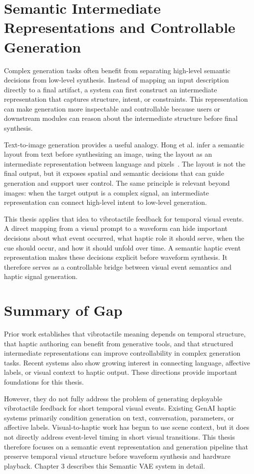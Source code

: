 \section{Semantic Intermediate Representations and Controllable Generation}

Complex generation tasks often benefit from separating high-level semantic decisions from low-level synthesis. Instead of mapping an input description directly to a final artifact, a system can first construct an intermediate representation that captures structure, intent, or constraints. This representation can make generation more inspectable and controllable because users or downstream modules can reason about the intermediate structure before final synthesis.

Text-to-image generation provides a useful analogy. Hong et al. infer a semantic layout from text before synthesizing an image, using the layout as an intermediate representation between language and pixels~\cite{hong2018semanticlayout}. The layout is not the final output, but it exposes spatial and semantic decisions that can guide generation and support user control. The same principle is relevant beyond images: when the target output is a complex signal, an intermediate representation can connect high-level intent to low-level generation.

This thesis applies that idea to vibrotactile feedback for temporal visual events. A direct mapping from a visual prompt to a waveform can hide important decisions about what event occurred, what haptic role it should serve, when the cue should occur, and how it should unfold over time. A semantic haptic event representation makes these decisions explicit before waveform synthesis. It therefore serves as a controllable bridge between visual event semantics and haptic signal generation.

\section{Summary of Gap}

Prior work establishes that vibrotactile meaning depends on temporal structure, that haptic authoring can benefit from generative tools, and that structured intermediate representations can improve controllability in complex generation tasks. Recent systems also show growing interest in connecting language, affective labels, or visual context to haptic output. These directions provide important foundations for this thesis.

However, they do not fully address the problem of generating deployable vibrotactile feedback for short temporal visual events. Existing GenAI haptic systems primarily condition generation on text, conversation, parameters, or affective labels. Visual-to-haptic work has begun to use scene context, but it does not directly address event-level timing in short visual transitions. This thesis therefore focuses on a semantic event representation and generation pipeline that preserve temporal visual structure before waveform synthesis and hardware playback. Chapter 3 describes this Semantic VAE system in detail.
